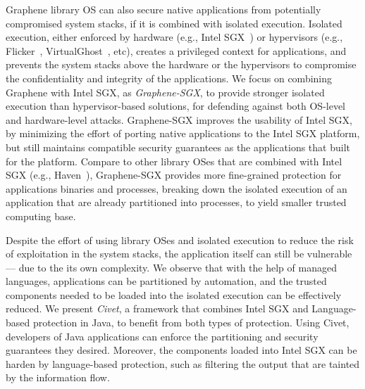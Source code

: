 Graphene library OS can also secure native applications from potentially compromised system stacks, if it is combined with isolated execution.
Isolated execution, either enforced by hardware (e.g., Intel SGX~\citep{intelsgx}) or hypervisors (e.g., Flicker~\citep{flicker}, VirtualGhost~\citep{criswell2014virtualghost}, etc), creates a privileged context for applications,
and prevents the system stacks above the hardware or the hypervisors
to compromise the confidentiality and integrity of the applications.  
We focus on combining Graphene with Intel SGX, as {\em Graphene-SGX},
to provide stronger isolated execution than hypervisor-based solutions,
for defending against both OS-level and hardware-level attacks.
Graphene-SGX improves the usability of Intel SGX, by minimizing the effort of porting native applications to the Intel SGX platform,
but still maintains compatible security guarantees as the applications that built for the platform.
Compare to other library OSes that are combined with Intel SGX (e.g., Haven~\citep{haven}),
Graphene-SGX provides more fine-grained protection for applications binaries and processes,
breaking down the isolated execution of
an application that are already partitioned into processes,
to yield smaller trusted computing base.

Despite the effort of using library OSes and isolated execution
to reduce the risk of exploitation in the system stacks,
the application itself can still be vulnerable
--- due to the its own complexity.
We observe that with the help of managed languages,
applications can be partitioned by automation,
and the trusted components needed to be loaded into the isolated execution
can be effectively reduced.
We present {\em Civet}, a framework that combines Intel SGX and Language-based protection in Java,
to benefit from both types of protection.
Using Civet,
developers of Java applications can enforce the partitioning and security guarantees they desired.
Moreover, the components loaded into Intel SGX can be harden by language-based protection,
such as filtering the output
that are tainted by the information flow.


